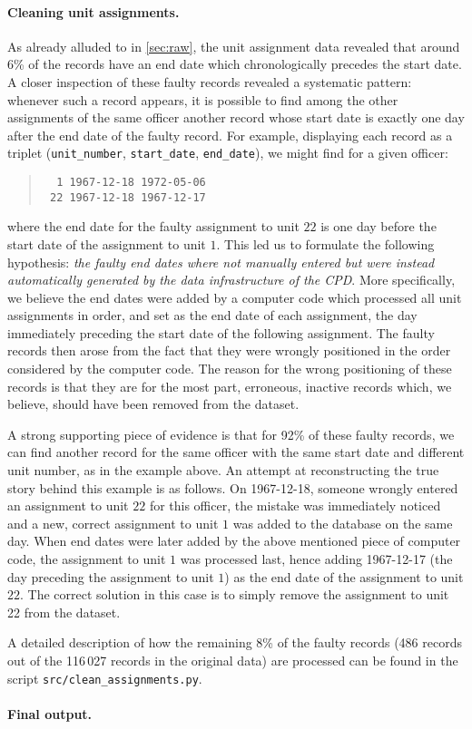 \paragraph{Cleaning unit assignments.}
As already alluded to in \cref{sec:raw}, the unit assignment data revealed that
around 6\% of the records have an end date which chronologically precedes the
start date. A closer inspection of these faulty records revealed a systematic
pattern: whenever such a record appears, it is possible to find among the other
assignments of the same officer another record whose start date is exactly one
day after the end date of the faulty record. For example, displaying each
record as a triplet (\texttt{unit\_number}, \texttt{start\_date},
\texttt{end\_date}), we might find for a given officer:
\begin{quote}
\begin{verbatim}
  1 1967-12-18 1972-05-06
 22 1967-12-18 1967-12-17
\end{verbatim}
\end{quote}
where the end date for the faulty assignment to unit $22$ is one day before the
start date of the assignment to unit $1$. This led us to formulate the
following hypothesis: \emph{the faulty end dates where not manually entered but
were instead automatically generated by the data infrastructure of the CPD}.
More specifically, we believe the end dates were added by a computer code which
processed all unit assignments in order, and set as the end date of each
assignment, the day immediately preceding the start date of the following
assignment. The faulty records then arose from the fact that they were wrongly
positioned in the order considered by the computer code. The reason for the
wrong positioning of these records is that they are for the most part,
erroneous, inactive records which, we believe, should have been removed from
the dataset.

A strong supporting piece of evidence is that for 92\% of these faulty records,
we can find another record for the same officer with the same start date and
different unit number, as in the example above. An attempt at reconstructing the
true story behind this example is as follows. On 1967-12-18, someone
wrongly entered an assignment to unit $22$ for this officer, the mistake was
immediately noticed and a new, correct assignment to unit $1$ was added to the
database on the same day. When end dates were later added by the above
mentioned piece of computer code, the assignment to unit $1$ was processed
last, hence adding 1967-12-17 (the day preceding the assignment to unit $1$) as
the end date of the assignment to unit $22$. The correct solution in this case
is to simply remove the assignment to unit 22 from the dataset.

A detailed description of how the remaining 8\% of the faulty records (486
records out of the 116\,027 records in the original data) are processed can be
found in the script \texttt{src/clean\_assignments.py}.

\paragraph{Final output.}
